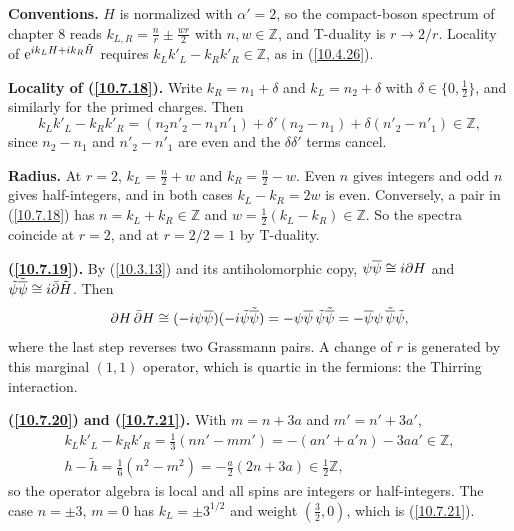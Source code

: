 	\begin{tcolorbox}[breakable]
		\begin{remark}
			\textbf{Conventions.} $H$ is normalized with $\alpha'=2$, so the compact-boson spectrum of chapter 8 reads $k_{L,R}=\frac nr\pm\frac{wr}{2}$ with $n,w\in\mathds Z$, and T-duality is $r\to2/r$. Locality of $\mathrm{e}^{i k_LH+i k_R\tilde H}$ requires $k_Lk'_L-k_Rk'_R\in\mathds Z$, as in (\ref{10.4.26}).

			\textbf{Locality of (\ref{10.7.18}).} Write $k_R=n_1+\delta$ and $k_L=n_2+\delta$ with $\delta\in\{0,\tfrac12\}$, and similarly for the primed charges. Then
			\begin{equation*}
				k_Lk'_L-k_Rk'_R=(n_2n'_2-n_1n'_1)+\delta'(n_2-n_1)+\delta(n'_2-n'_1)\in\mathds Z ,
			\end{equation*}
			since $n_2-n_1$ and $n'_2-n'_1$ are even and the $\delta\delta'$ terms cancel.

			\textbf{Radius.} At $r=2$, $k_L=\tfrac n2+w$ and $k_R=\tfrac n2-w$. Even $n$ gives integers and odd $n$ gives half-integers, and in both cases $k_L-k_R=2w$ is even. Conversely, a pair in (\ref{10.7.18}) has $n=k_L+k_R\in\mathds Z$ and $w=\tfrac12(k_L-k_R)\in\mathds Z$. So the spectra coincide at $r=2$, and at $r=2/2=1$ by T-duality.

			\textbf{(\ref{10.7.19}).} By (\ref{10.3.13}) and its antiholomorphic copy, $\psi\overline\psi\cong i\partial H$ and $\tilde\psi\tilde{\overline\psi}\cong i\bar\partial\tilde H$. Then
			\begin{equation*}
				\partial H\,\bar\partial H\cong(-i\psi\overline\psi)(-i\tilde\psi\tilde{\overline\psi})=-\psi\overline\psi\,\tilde\psi\tilde{\overline\psi}=-\overline\psi\psi\,\tilde{\overline\psi}\tilde\psi ,
			\end{equation*}
			where the last step reverses two Grassmann pairs. A change of $r$ is generated by this marginal $(1,1)$ operator, which is quartic in the fermions: the Thirring interaction.

			\textbf{(\ref{10.7.20}) and (\ref{10.7.21}).} With $m=n+3a$ and $m'=n'+3a'$,
			\begin{gather*}
				k_Lk'_L-k_Rk'_R=\tfrac13(nn'-mm')=-(an'+a'n)-3aa'\in\mathds Z,\\ h-\tilde h=\tfrac16(n^{2}-m^{2})=-\tfrac a2(2n+3a)\in\tfrac12\mathds Z ,
			\end{gather*}
			so the operator algebra is local and all spins are integers or half-integers. The case $n=\pm3$, $m=0$ has $k_L=\pm3^{1/2}$ and weight $(\tfrac32,0)$, which is (\ref{10.7.21}).
		\end{remark}
	\end{tcolorbox}
	
